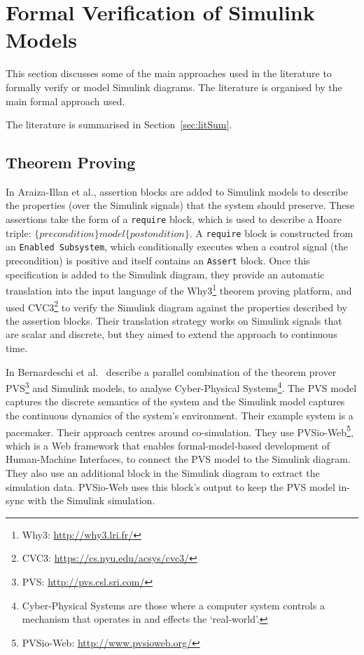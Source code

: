 \section{Formal Verification of Simulink Models}
\label{sec:formalSimulinkVerification}

This section discusses some of the main approaches used in the literature to formally verify or model Simulink diagrams. The literature is organised by the main formal approach used.

The literature is summarised in Section~\ref{sec:litSum}.

\subsection{Theorem Proving}
\label{sec:tp}

In Araiza-Illan et al.\cite{araiza-illan_formal_2014}, assertion blocks are added to Simulink models to describe the properties (over the Simulink signals) that the system should preserve. These assertions take the form of a \texttt{require} block, which is used to describe a Hoare triple: $\{precondition\} model \{postondition\}$. A \texttt{require} block is constructed from an \texttt{Enabled Subsystem}, which conditionally executes when a control signal (the precondition) is positive and itself contains an \texttt{Assert} block. Once this specification is added to the Simulink diagram, they provide an automatic translation into the input language of the Why3\footnote{Why3: \url{http://why3.lri.fr/}} theorem proving platform, and used CVC3\footnote{CVC3: \url{https://cs.nyu.edu/acsys/cvc3/}} to verify the Simulink diagram against the properties described by the assertion blocks. Their translation strategy works on Simulink signals that are scalar and discrete, but they aimed to extend the approach to continuous time. 

In Bernardeschi et al.~\cite{bernardeschi_pvs-simulink_2018} describe a parallel combination of the theorem prover PVS\footnote{PVS: \url{http://pvs.csl.sri.com/} } and Simulink models, to analyse Cyber-Physical Systems\footnote{Cyber-Physical Systems are those where a computer system controls a mechanism that operates in and effects the `real-world'.}. The PVS model captures the discrete semantics of the system and the Simulink model captures the continuous dynamics of the system's environment. Their example system is a pacemaker. Their approach centres around co-simulation. They use PVSio-Web\footnote{PVSio-Web: \url{http://www.pvsioweb.org/}}, which is a Web framework that enables formal-model-based development of Human-Machine Interfaces, to connect the PVS model to the Simulink diagram. They also use an additional block in the Simulink diagram to extract the simulation data. PVSio-Web uses this block's output to keep the PVS model in-sync with the Simulink simulation.

